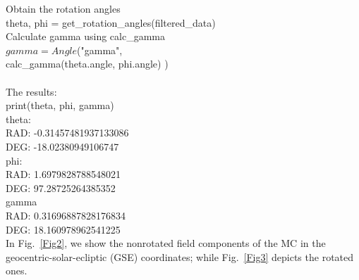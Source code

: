 \documentclass[baaa]{baaa}
\begin{document}
Obtain the rotation angles\\
theta, phi = get\_rotation\_angles(filtered\_data)\\
Calculate gamma using calc\_gamma\\
$gamma = Angle$("gamma",\\
        calc\_gamma(theta.angle, phi.angle) )\\
 \\       
The results:\\    
print(theta, phi, gamma)\\
theta:\\
 RAD: -0.31457481937133086\\
 DEG: -18.02380949106747\\
phi:\\
 RAD: 1.6979828788548021\\
 DEG: 97.28725264385352\\
gamma\\
 RAD: 0.31696887828176834\\
 DEG: 18.160978962541225\\
In Fig.~\ref{Fig2}, we show the nonrotated field components of the MC in the geocentric-solar-ecliptic (GSE) coordinates; while Fig.~\ref{Fig3} depicts the rotated ones. \\
\\
\end{document}
